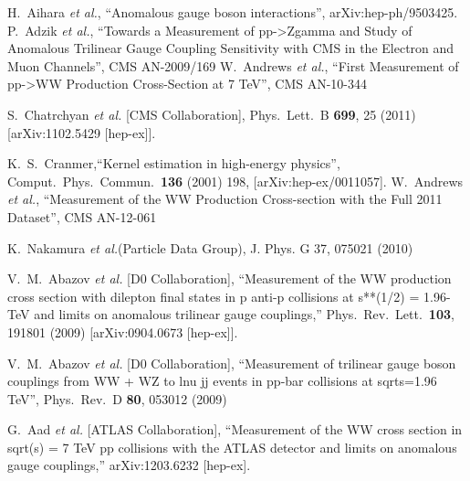 \begin{thebibliography}{99}                                                                                                                               
  H.~Aihara {\it et al.}, ``Anomalous gauge boson interactions'',
  arXiv:hep-ph/9503425.
  P.~Adzik {\it et al.}, ``Towards a Measurement of pp->Zgamma and Study of Anomalous Trilinear Gauge Coupling Sensitivity with CMS in the Electron and Muon Channels'',
  CMS AN-2009/169
  W.~Andrews {\it et al.}, ``First Measurement of pp->WW Production Cross-Section at 7 TeV'',
  CMS AN-10-344

  S.~Chatrchyan {\it et al.}  [CMS Collaboration], Phys.\ Lett.\ B {\bf 699}, 25 (2011) [arXiv:1102.5429 [hep-ex]].

  K.~S.~Cranmer,``Kernel estimation in high-energy physics'',  Comput.\ Phys.\ Commun.\  {\bf 136} (2001) 198,  [arXiv:hep-ex/0011057].
W.~Andrews {\it et al.}, ``Measurement of the WW Production Cross-section with the Full 2011 Dataset'',
CMS AN-12-061

%
%

  K.~Nakamura {\it et al.}(Particle Data Group), J. Phys. G 37, 075021 (2010)

  V.~M.~Abazov {\it et al.}  [D0 Collaboration],
  ``Measurement of the WW production cross section with dilepton final states in p anti-p collisions at s**(1/2) = 1.96-TeV and limits on anomalous trilinear gauge couplings,''
  Phys.\ Rev.\ Lett.\  {\bf 103}, 191801 (2009)
  [arXiv:0904.0673 [hep-ex]].

  V.~M.~Abazov {\it et al.}  [D0 Collaboration], ``Measurement of trilinear gauge boson couplings from WW + WZ to lnu jj events in pp-bar collisions at sqrt{s}=1.96 TeV'',
  Phys.\ Rev.\  D {\bf 80}, 053012 (2009)

\bibitem{} 
  G.~Aad {\it et al.}  [ATLAS Collaboration],
  ``Measurement of the WW cross section in sqrt(s) = 7 TeV pp collisions with the ATLAS detector and limits on anomalous gauge couplings,''
  arXiv:1203.6232 [hep-ex].

\end{thebibliography}


